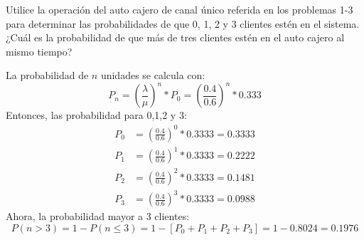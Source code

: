 	


\begin{problema}
	Utilice la operación del auto cajero de canal único referida en los problemas 1-3 para determinar las probabilidades de que 0, 1, 2 y 3 clientes estén en el sistema. ¿Cuál es la probabilidad de que más de tres clientes estén en el auto cajero al mismo tiempo?
\end{problema}
\begin{sol}
	La probabilidad de $n$ unidades se calcula con: 
	$$P_n=\left(\frac{\lambda}{\mu}\right)^n *P_0=\left(\frac{0.4}{0.6}\right)^n *0.333$$
	Entonces, las probabilidad para 0,1,2 y 3: 
	\begin{align*}
		P_0&=\left(\frac{0.4}{0.6}\right)^0 *0.3333 = 0.3333\\
		P_1&=\left(\frac{0.4}{0.6}\right)^1*0.3333=0.2222\\
		P_2&=\left(\frac{0.4}{0.6}\right)^2 *0.3333=0.1481\\
		P_3&=\left(\frac{0.4}{0.6}\right)^3 *0.3333=0.0988
	\end{align*}
Ahora, la probabilidad mayor a 3 clientes: 
$$P(n>3)=1-P(n\leq 3)=1-[P_0+P_1+P_2+P_3]=1- 0.8024=0.1976 $$
\end{sol}


